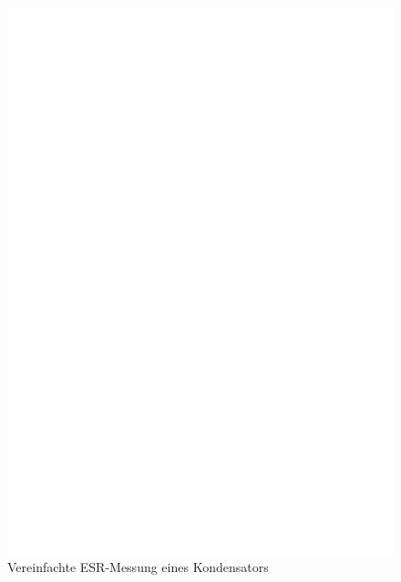 \begin{figure}[H]
  \centering
    \includegraphics[]{../FIG/Cap_esr2.eps}
  \caption{Vereinfachte ESR-Messung eines Kondensators}
  \label{fig:Cap_esr2}
\end{figure}



